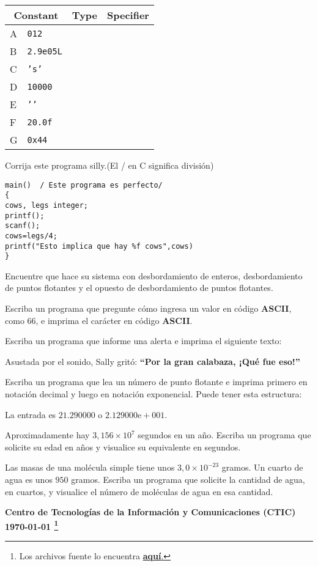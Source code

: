 \documentclass[spanish,addpoints,answers,a4paper]{exam}
\newcommand{\unmarkedfntext}[1]{%
	\begingroup
	\renewcommand\thefootnote{}\footnote{#1}%
	\addtocounter{footnote}{-1}%
	\endgroup
}
\begin{document}
\begin{questions}
\begin{table}[H]
	\centering
\begin{tabular}{|l|l|c|c|}
	\hline
	\multicolumn{2}{|c|}{\bfseries Constant} & \textbf{Type} & \textbf{Specifier}	\\
	\hline
	A	&	\texttt{012} 	& 	& 	\\
	\hline
	B 	&	\texttt{2.9e05L}&	&	\\
	\hline
	C	&	\texttt{'s'}	& 	&	\\
	\hline
	D	&	\texttt{10000} 	& 	&	\\
	\hline
	E	&	\texttt{'\n'} 	&	&	\\
	\hline
	F	&	\texttt{20.0f}	&	&	\\
	\hline
	G	&	\texttt{0x44}	&	&	\\
	\hline
\end{tabular}
\end{table}

\question Corrija este programa silly.\qquad(El / en C significa división)

\begin{verbatim}
main()	/ Este programa es perfecto/
{
cows, legs integer;
printf();
scanf();
cows=legs/4;
printf("Esto implica que hay %f cows",cows)
}
\end{verbatim}

\question Encuentre que hace su sistema con desbordamiento de enteros, desbordamiento de puntos flotantes y el opuesto de desbordamiento de puntos flotantes.

\question Escriba un programa que pregunte cómo ingresa un valor en código \textbf{ASCII}, como $66$, e imprima el carácter en código \textbf{ASCII}.

\question Escriba un programa que informe una alerta e imprima el siguiente texto:

Asustada por el sonido, Sally gritó: \textbf{``Por la gran calabaza, ¡Qué fue eso!''}

\question Escriba un programa que lea un número de punto flotante e imprima primero en notación decimal y luego en notación exponencial. Puede tener esta estructura:

La entrada es $21.290000$ o $2.129000\text{e}+001$.

\question Aproximadamente hay $3,156\times10^{7}$ segundos en un año. Escriba un programa que solicite su edad en años y visualice su equivalente en segundos.

\question Las masas de una molécula simple tiene unos $3,0\times10^{-23}$ gramos. Un cuarto de agua es unos $950$ gramos. Escriba un programa que solicite la cantidad de agua, en cuartos, y visualice el número de moléculas de agua en esa cantidad. 
\end{questions}

\begin{flushright}\bfseries
Centro de Tecnologías de la Información y Comunicaciones (CTIC)\\[2mm]
\today\unmarkedfntext{Los archivos fuente lo encuentra  \href{https://github.com/carlosal1015/C-Programming}{\textbf{aquí}.}}
\end{flushright}
\end{document}
